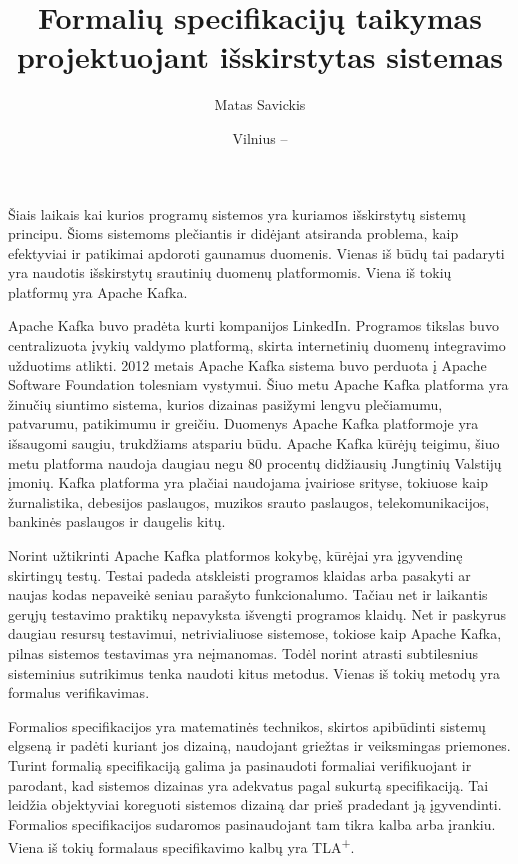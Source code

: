 \documentclass{VUMIFPSmagistrinis}
\title{Formalių specifikacijų taikymas projektuojant išskirstytas sistemas}
\author{Matas Savickis}
\date{Vilnius – \the\year}
\begin{document}
\maketitle

\tableofcontents


		Šiais laikais kai kurios programų sistemos yra kuriamos išskirstytų sistemų principu\cite{mcr}.
		Šioms sistemoms plečiantis ir didėjant atsiranda problema, kaip efektyviai ir patikimai apdoroti gaunamus duomenis.
		Vienas iš būdų tai padaryti yra naudotis išskirstytų srautinių duomenų platformomis.
		Viena iš tokių platformų yra Apache Kafka.


 		Apache Kafka buvo pradėta kurti kompanijos LinkedIn. Programos tikslas buvo centralizuota įvykių valdymo platformą, skirta internetinių duomenų integravimo užduotims atlikti.
		2012 metais Apache Kafka sistema buvo perduota į Apache Software Foundation tolesniam vystymui.
		Šiuo metu Apache Kafka platforma yra žinučių siuntimo sistema, kurios dizainas pasižymi lengvu plečiamumu, patvarumu, patikimumu ir greičiu.
		Duomenys Apache Kafka platformoje yra išsaugomi saugiu, trukdžiams atspariu būdu.
		Apache Kafka kūrėjų teigimu, šiuo metu platforma naudoja daugiau negu 80 procentų didžiausių Jungtinių Valstijų įmonių.
		Kafka platforma yra plačiai naudojama įvairiose srityse, tokiuose kaip žurnalistika, debesijos paslaugos, muzikos srauto paslaugos, telekomunikacijos, bankinės paslaugos ir daugelis kitų.


		Norint užtikrinti Apache Kafka platformos kokybę, kūrėjai yra įgyvendinę skirtingų testų.
		Testai padeda atskleisti programos klaidas arba pasakyti ar naujas kodas nepaveikė seniau parašyto funkcionalumo.
		Tačiau net ir laikantis gerųjų testavimo praktikų nepavyksta išvengti programos klaidų.
		Net ir paskyrus daugiau resursų testavimui, netrivialiuose sistemose, tokiose kaip Apache Kafka, pilnas sistemos testavimas yra neįmanomas.
		Todėl norint atrasti subtilesnius sisteminius sutrikimus tenka naudoti kitus metodus.
		Vienas iš tokių metodų yra formalus verifikavimas.


		Formalios specifikacijos yra matematinės technikos, skirtos apibūdinti sistemų elgseną ir padėti kuriant jos dizainą, naudojant griežtas ir veiksmingas priemones.
		Turint formalią specifikaciją galima ja pasinaudoti formaliai verifikuojant ir parodant, kad sistemos dizainas yra adekvatus pagal sukurtą specifikaciją.
		Tai leidžia objektyviai koreguoti sistemos dizainą dar prieš pradedant ją įgyvendinti.
		Formalios specifikacijos sudaromos pasinaudojant tam tikra kalba arba įrankiu.
		Viena iš tokių formalaus specifikavimo kalbų yra TLA\textsuperscript{+}.
		
\end{document}

